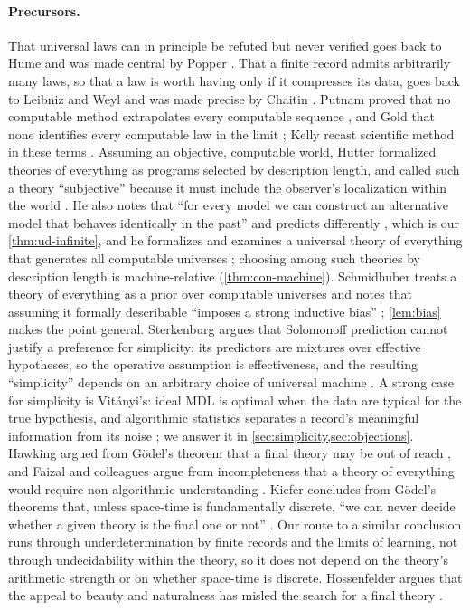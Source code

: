 \paragraph{Precursors.}
That universal laws can in principle be refuted but never verified goes back to Hume
and was made central by Popper \citep{popper1959}. That a finite record admits arbitrarily many laws,
so that a law is worth having only if it compresses its data, goes back to Leibniz and
Weyl \citep{leibniz1686,weyl1932} and was made precise by Chaitin \citep{chaitin2005}.
Putnam proved that no computable method extrapolates every computable sequence
\citep{putnam1963}, and Gold that none identifies every computable law in the limit
\citep{gold1967}; Kelly recast scientific method in these terms
\citep{kelly1996}. Assuming an objective, computable world, Hutter formalized theories
of everything as programs selected by description length, and called such a theory
``subjective'' because it must include the observer's localization within the world
\citep[Sec.~4]{hutter2010}. He also notes that ``for every model we can construct an
alternative model that behaves identically in the past'' and predicts differently
\citep[Sec.~4]{hutter2010}, which is our \cref{thm:ud-infinite}, and he formalizes and examines a
universal theory of everything that generates all computable universes
\citep[Sec.~6]{hutter2010}; choosing among such theories by description length is
machine-relative (\cref{thm:con-machine}). Schmidhuber treats a theory of everything as a
prior over computable universes and notes that assuming it formally describable
``imposes a strong inductive bias'' \citep[abstract]{schmidhuber2000}; \cref{lem:bias} makes the
point general. Sterkenburg argues that Solomonoff prediction cannot justify a
preference for simplicity: its predictors are mixtures over effective hypotheses, so
the operative assumption is effectiveness, and the resulting ``simplicity'' depends on
an arbitrary choice of universal machine \citep{sterkenburg2016}. A strong case for
simplicity is Vitányi's: ideal MDL is optimal when the data are typical for the true
hypothesis, and algorithmic statistics separates a record's meaningful information from
its noise \citep{vitanyi-li2000,gacs2001}; we answer it in \cref{sec:simplicity,sec:objections}.
Hawking argued from
G\"odel's theorem that a final theory may be out of reach \citep{hawking2002}, and
Faizal and colleagues argue from incompleteness that a theory of everything would require
non-algorithmic understanding \citep{faizal2025}. Kiefer concludes from G\"odel's theorems that,
unless space-time is fundamentally discrete, ``we can never decide whether a given
theory is the final one or not'' \citep[abstract]{kiefer2024}. Our route to a similar conclusion
runs through underdetermination by finite records and the limits of learning, not
through undecidability within the theory, so it does not depend on the theory's
arithmetic strength or on whether space-time is discrete. Hossenfelder argues that the
appeal to beauty and naturalness has misled the search for a final theory \citep{hossenfelder2018}.


